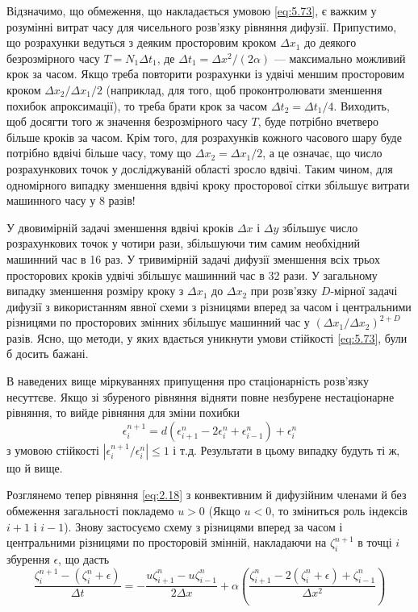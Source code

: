 Відзначимо, що обмеження, що накладається умовою \eqref{eq:5.73}, є важким у розумінні витрат часу для чисельного розв'язку рівняння дифузії. Припустимо, що розрахунки ведуться з деяким просторовим кроком $\Delta x_1$ до деякого безрозмірного часу $T = N_1 \Delta t_1$, де $\Delta t_1 = \Delta x^2 / (2 \alpha)$ --- максимально можливий крок за часом. Якщо треба повторити розрахунки із удвічі меншим просторовим кроком $\Delta x_2 / \Delta x_1 / 2$ (наприклад, для того, щоб проконтролювати зменшення похибок апроксимації), то треба брати крок за часом $\Delta t_2 = \Delta t_1 / 4$. Виходить, щоб досягти того ж значення безрозмірного часу $T$, буде потрібно вчетверо більше кроків за часом. Крім того, для розрахунків кожного часового шару буде потрібно вдвічі більше часу, тому що $\Delta x_2 = \Delta x_1 / 2$, а це означає, що число розрахункових точок у досліджуваній області зросло вдвічі. Таким чином, для одномірного випадку зменшення вдвічі кроку просторової сітки збільшує витрати машинного часу у 8 разів! \medskip

У двовимірній задачі зменшення вдвічі кроків $\Delta x$ і $\Delta y$ збільшує число розрахункових точок у чотири рази, збільшуючи тим самим необхідний машинний час в 16 раз. У тривимірній задачі дифузії зменшення всіх трьох просторових кроків удвічі збільшує машинний час в 32 рази. У загальному випадку зменшення розміру кроку з $\Delta x_1$ до $\Delta x_2$ при розв'язку $D$-мірної задачі дифузії з використанням явної схеми з різницями вперед за часом і центральними різницями по просторових змінних збільшує машинний час у $(\Delta x_1 / \Delta x_2)^{2 + D}$ разів. Ясно, що методи, у яких вдається уникнути умови стійкості \eqref{eq:5.73}, були б досить бажані. \medskip

В наведених вище міркуваннях припущення про стаціонарність розв'язку несуттєве. Якщо зі збуреного рівняння відняти повне незбурене нестаціонарне рівняння, то вийде рівняння для зміни похибки
\begin{equation}
    \epsilon_i^{n + 1} = d (\epsilon_{i + 1}^n - 2 \epsilon_i^n + \epsilon_{i - 1}^n) + \epsilon_i^n
\end{equation}
з умовою стійкості $|\epsilon_i^{n + 1} / \epsilon_i^n| \le 1$ і т.д. Результати в цьому випадку будуть ті ж, що й вище. \medskip

Розглянемо тепер рівняння \eqref{eq:2.18} з конвективним й дифузійним членами й без обмеження загальності покладемо $u > 0$ (Якщо $u < 0$, то зміниться роль індексів $i + 1$ і $i - 1$). Знову застосуємо схему з різницями вперед за часом і центральними різницями по просторовій змінній, накладаючи на $\zeta_i^{n + 1}$ в точці $i$ збурення $\epsilon$, що дасть
\begin{equation}
    \label{eq:5.75}
    \frac{\zeta_i^{n + 1} - (\zeta_i^n + \epsilon)}{\Delta t} = - \frac{u \zeta_{i + 1}^n - u \zeta_{i - 1}^n}{2 \Delta x} + \alpha \left( \frac{\zeta_{i + 1}^n - 2 (\zeta_i^n + \epsilon) + \zeta_{i - 1}^n}{\Delta x^2} \right)
\end{equation}

